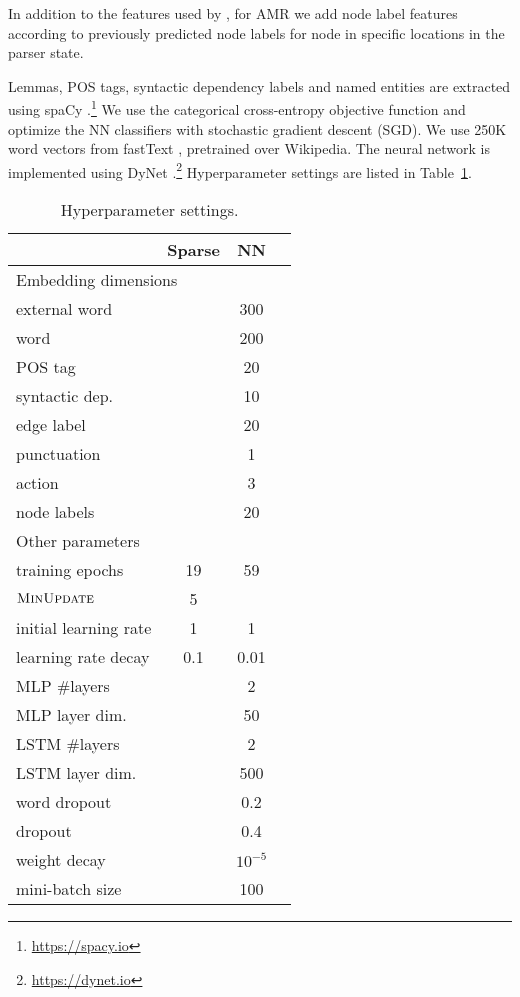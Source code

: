 \documentclass[11pt,a4paper]{article}
\begin{document}
In addition to the features used by \citet{hershcovich2017a},
for AMR we add node label features according to
previously predicted node labels for node in specific locations in the parser state.

Lemmas, POS tags, syntactic dependency labels and named entities are extracted using spaCy
\cite{spacy2}.\footnote{\url{https://spacy.io}}
We use the categorical cross-entropy objective function and optimize the
NN classifiers with stochastic gradient descent (SGD).
We use 250K word vectors from fastText \cite{bojanowski2016enriching}, pretrained over Wikipedia.
The neural network is implemented using DyNet \cite{neubig2017dynet}.\footnote{\url{https://dynet.io}}
Hyperparameter settings are listed in Table~\ref{tab:hyperparams}.

\begin{table}
\begin{tabular}{l|ccc}
& Sparse & NN \\
\hline
\multicolumn{3}{l}{\footnotesize Embedding dimensions} \\
external word & & 300 \\
word & & 200 \\
POS tag & & 20 \\
syntactic dep. & & 10 \\
edge label & & 20 \\
punctuation & & 1 \\
action & & 3 \\
node labels & & 20 \\
\hline
\multicolumn{3}{l}{\footnotesize Other parameters} \\
training epochs & 19 & 59 \\
$\textsc{MinUpdate}$ & 5 \\
initial learning rate & 1 & 1 \\
learning rate decay & 0.1 & 0.01 \\
MLP \#layers & & 2 \\
MLP layer dim. & & 50 \\
LSTM \#layers & & 2 \\
LSTM layer dim. & & 500 \\
word dropout & & 0.2 \\
dropout & & 0.4 \\
weight decay & & $10^{-5}$ \\
mini-batch size & & 100
\end{tabular}
\caption{Hyperparameter settings.\label{tab:hyperparams}}
\end{table}
\end{document}
